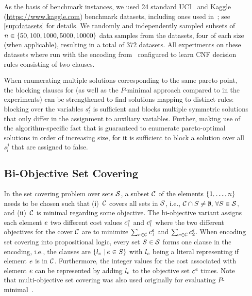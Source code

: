 As the basis of benchmark instances, we used 24 standard UCI~\autocite{UciMlr} and Kaggle ({\small\url{https://www.kaggle.com}}) benchmark datasets, including ones used in~\textcite{DBLP:conf/cp/MaliotovM18}; see \cref{sup:datasets} for details.
We randomly and independently sampled subsets of $n\in\{50,100,1000,5000,10000\}$ data samples from the datasets, four of each size (when applicable), resulting in a total of 372 datasets. %
All experiments on these datasets where run with the encoding from~\textcite{DBLP:conf/cp/MaliotovM18} configured to learn CNF decision rules consisting of two clauses.

When enumerating multiple solutions corresponding to the same pareto point, the blocking clauses for \algname{} (as well as the $P$-minimal approach compared to in the experiments) can be strengthened to find solutions mapping to distinct rules:
blocking over the variables $s_l^j$ is sufficient and blocks multiple symmetric solutions that only differ in the assignment to auxiliary variables.
Further, making use of the algorithm-specific fact that \algname{} is guaranteed to enumerate pareto-optimal solutions in order of increasing size, for \algname{} it is sufficient to block a solution over all $s_l^j$ that are assigned to false.

\subsection{Bi-Objective Set Covering}

In the set covering problem over sets $\mathcal{S}$, a subset $\mathcal{C}$ of the elements $\{1,\dots,n\}$ needs to be chosen such that (i)~$\mathcal{C}$ covers all sets in $\mathcal{S}$, i.e., $\mathcal{C}\cap S\neq\emptyset,\,\forall S\in\mathcal{S}$, and (ii)~$\mathcal{C}$ is minimal regarding some objective.
The bi-objective variant assigns each element $e$ two different cost values $c^e_1$ and $c^e_1$ where the two different objectives for the cover $\mathcal{C}$ are to minimize $\sum_{e\in\mathcal{C}}c^e_1$ and $\sum_{e\in\mathcal{C}}c^e_2$.
When encoding set covering into propositional logic, every set $S\in\mathcal{S}$ forms one clause in the encoding, i.e., the clauses are $\{l_e \mid e\in S\}$ with $l_e$ being a literal representing if element $e$ is in $\mathcal{C}$.
Furthermore, the integer values for the cost associated with element $e$ can be represented by adding $l_e$ to the objective set $c^e$ times.
Note that multi-objective set covering was also used originally for evaluating $P$-minimal~\autocite{DBLP:conf/cp/SohBTB17}.

